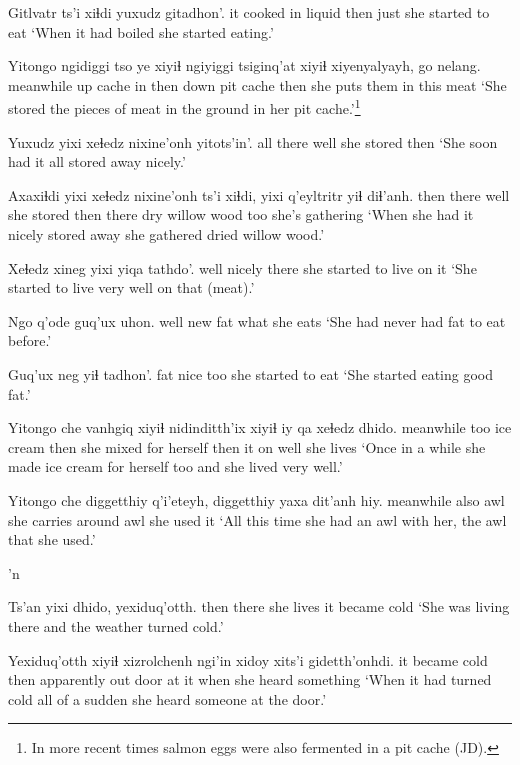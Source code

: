 \documentclass[12pt]{article}
\begin{document}
\gll Gitlvatr ts'i xiɬdi yuxudz gitadhon'.
{it cooked in liquid} {} then just {she started to eat}
\glt `When it had boiled she started eating.'
\glend

\gll Yitongo ngidiggi tso ye xiyiɬ ngiyiggi tsiginq'at xiyiɬ xiyenyalyayh, go nelang.
meanwhile up cache in then down {pit cache} then {she puts them in} this meat
\glt `She stored the pieces of meat in the ground in her pit cache.'\footnote{In more recent times salmon eggs were also fermented in a pit cache (JD).}
\glend

\gll Yuxudz yixi xeɬedz nixine'onh yitots'in'.
all there well {she stored} then
\glt `She soon had it all stored away nicely.'
\glend

\gll Axaxiɬdi yixi xeɬedz nixine'onh ts'i xiɬdi, yixi q'eyltritr yiɬ diɬ'anh.
then there well {she stored} {} then there {dry willow wood} too {she's gathering}
\glt `When she had it nicely stored away she gathered dried willow wood.'
\glend

\gll Xeɬedz xineg yixi {yiqa tathdo'.}
well nicely there {she started to live on it}
\glt `She started to live very well on that (meat).'
\glend

\gll Ngo q'ode guq'ux uhon. 
well new fat {what she eats}
\glt `She had never had fat to eat before.'
\glend

\gll Guq'ux neg yiɬ tadhon'.
fat nice too {she started to eat}
\glt `She started eating good fat.'
\glend

\gll Yitongo che vanhgiq xiyiɬ nidinditth'ix xiyiɬ iy qa xeɬedz dhido.
meanwhile too {ice cream} then {she mixed for herself} then it on well {she lives}
\glt `Once in a while she made ice cream for herself too and she lived very well.'
\glend

\gll Yitongo che diggetthiy q'i'eteyh, diggetthiy {yaxa dit'anh} hiy.
meanwhile also awl {she carries around} awl {she used} it
\glt `All this time she had an awl with her, the awl that she used.'
\glend

'n

\gll Ts'an yixi dhido, yexiduq'otth.
then there {she lives} {it became cold}
\glt `She was living there and the weather turned cold.'
\glend

\gll Yexiduq'otth xiyiɬ xizrolchenh ngi'in xidoy xits'i gidetth'onhdi.
{it became cold} then apparently out door {at it} {when she heard something}
\glt `When it had turned cold all of a sudden she heard someone at the door.'
\glend
\end{document}
